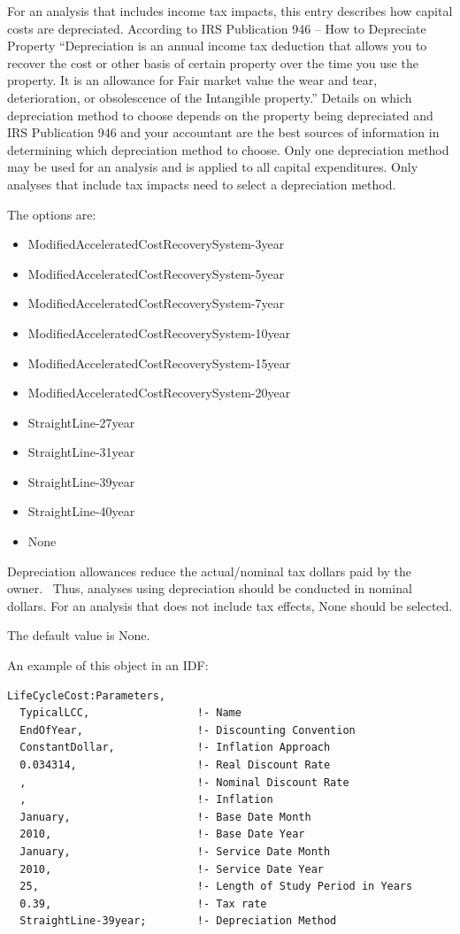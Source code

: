 For an analysis that includes income tax impacts, this entry describes how capital costs are depreciated. According to IRS Publication 946 -- How to Depreciate Property ``Depreciation is an annual income tax deduction that allows you to recover the cost or other basis of certain property over the time you use the property. It is an allowance for Fair market value the wear and tear, deterioration, or obsolescence of the Intangible property.'' Details on which depreciation method to choose depends on the property being depreciated and IRS Publication 946 and your accountant are the best sources of information in determining which depreciation method to choose. Only one depreciation method may be used for an analysis and is applied to all capital expenditures. Only analyses that include tax impacts need to select a depreciation method.

The options are:

\begin{itemize}
\item
  ModifiedAcceleratedCostRecoverySystem-3year
\item
  ModifiedAcceleratedCostRecoverySystem-5year
\item
  ModifiedAcceleratedCostRecoverySystem-7year
\item
  ModifiedAcceleratedCostRecoverySystem-10year
\item
  ModifiedAcceleratedCostRecoverySystem-15year
\item
  ModifiedAcceleratedCostRecoverySystem-20year
\item
  StraightLine-27year
\item
  StraightLine-31year
\item
  StraightLine-39year
\item
  StraightLine-40year
\item
  None
\end{itemize}

Depreciation allowances reduce the actual/nominal tax dollars paid by the owner.~ Thus, analyses using depreciation should be conducted in nominal dollars. For an analysis that does not include tax effects, None should be selected.

The default value is None.

An example of this object in an IDF:

\begin{lstlisting}
LifeCycleCost:Parameters,
  TypicalLCC,                 !- Name
  EndOfYear,                  !- Discounting Convention
  ConstantDollar,             !- Inflation Approach
  0.034314,                   !- Real Discount Rate
  ,                           !- Nominal Discount Rate
  ,                           !- Inflation
  January,                    !- Base Date Month
  2010,                       !- Base Date Year
  January,                    !- Service Date Month
  2010,                       !- Service Date Year
  25,                         !- Length of Study Period in Years
  0.39,                       !- Tax rate
  StraightLine-39year;        !- Depreciation Method
\end{lstlisting}

